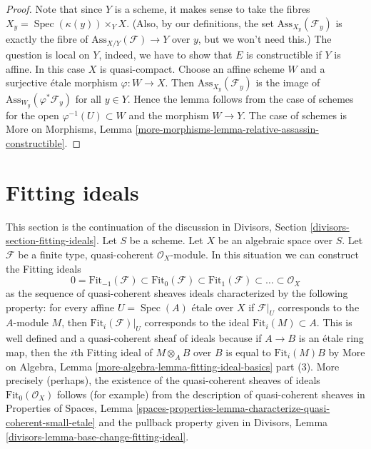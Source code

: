\documentclass{stacks-project}
\theoremstyle{plain}
\theoremstyle{definition}
\theoremstyle{remark}
\numberwithin{equation}{subsection}
\def\Spec{\mathop{\mathrm{Spec}}}
\begin{document}
\begin{proof}
Note that since $Y$ is a scheme, it makes sense to take the fibres
$X_y = \Spec(\kappa(y)) \times_Y X$. (Also, by our definitions, the
set $\text{Ass}_{X_y}(\mathcal{F}_y)$ is exactly the fibre of
$\text{Ass}_{X/Y}(\mathcal{F}) \to Y$ over $y$, but we won't need this.)
The question is local on $Y$, indeed, we have to show that
$E$ is constructible if $Y$ is affine.
In this case $X$ is quasi-compact. Choose an affine scheme $W$
and a surjective \'etale morphism $\varphi : W \to X$.
Then $\text{Ass}_{X_y}(\mathcal{F}_y)$ is the image of
$\text{Ass}_{W_y}(\varphi^*\mathcal{F}_y)$ for all $y \in Y$.
Hence the lemma follows from the case of schemes for
the open $\varphi^{-1}(U) \subset W$ and the morphism $W \to Y$.
The case of schemes is
More on Morphisms, Lemma
\ref{more-morphisms-lemma-relative-assassin-constructible}.
\end{proof}









\section{Fitting ideals}
\label{section-fitting-ideals}

\noindent
This section is the continuation of the discussion in
Divisors, Section \ref{divisors-section-fitting-ideals}.
Let $S$ be a scheme. Let $X$ be an algebraic space over $S$.
Let $\mathcal{F}$ be a finite type, quasi-coherent $\mathcal{O}_X$-module.
In this situation we can construct the Fitting ideals
$$
0 = \text{Fit}_{-1}(\mathcal{F}) \subset \text{Fit}_0(\mathcal{F}) \subset
\text{Fit}_1(\mathcal{F}) \subset \ldots \subset \mathcal{O}_X
$$
as the sequence of quasi-coherent sheaves ideals characterized by the
following property: for every affine $U = \Spec(A)$ \'etale over $X$
if $\mathcal{F}|_U$ corresponds to the $A$-module $M$, then
$\text{Fit}_i(\mathcal{F})|_U$
corresponds to the ideal $\text{Fit}_i(M) \subset A$.
This is well defined and a quasi-coherent sheaf of ideals because
if $A \to B$ is an \'etale ring map, then the $i$th Fitting ideal
of $M \otimes_A B$ over $B$ is equal to $\text{Fit}_i(M) B$ by
More on Algebra, Lemma \ref{more-algebra-lemma-fitting-ideal-basics} part (3).
More precisely (perhaps), the existence of the quasi-coherent sheaves of ideals
$\text{Fit}_0(\mathcal{O}_X)$ follows (for example) from
the description of quasi-coherent sheaves in
Properties of Spaces, Lemma
\ref{spaces-properties-lemma-characterize-quasi-coherent-small-etale}
and the pullback property given in
Divisors, Lemma \ref{divisors-lemma-base-change-fitting-ideal}.
\end{document}
